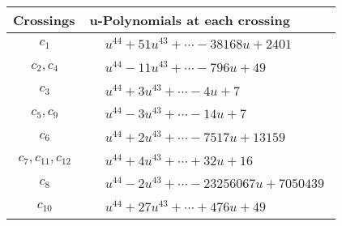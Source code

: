 \documentclass[1p]{elsarticle_modified}
\theoremstyle{definition}
\begin{document}
\begin{tabular}{m{50pt}|m{274pt}}
Crossings & \hspace{64pt}u-Polynomials at each crossing \\
\hline $$\begin{aligned}c_{1}\end{aligned}$$&$\begin{aligned}
&u^{44}+51 u^{43}+\cdots-38168 u+2401
\end{aligned}$\\
\hline $$\begin{aligned}c_{2},c_{4}\end{aligned}$$&$\begin{aligned}
&u^{44}-11 u^{43}+\cdots-796 u+49
\end{aligned}$\\
\hline $$\begin{aligned}c_{3}\end{aligned}$$&$\begin{aligned}
&u^{44}+3 u^{43}+\cdots-4 u+7
\end{aligned}$\\
\hline $$\begin{aligned}c_{5},c_{9}\end{aligned}$$&$\begin{aligned}
&u^{44}-3 u^{43}+\cdots-14 u+7
\end{aligned}$\\
\hline $$\begin{aligned}c_{6}\end{aligned}$$&$\begin{aligned}
&u^{44}+2 u^{43}+\cdots-7517 u+13159
\end{aligned}$\\
\hline $$\begin{aligned}c_{7},c_{11},c_{12}\end{aligned}$$&$\begin{aligned}
&u^{44}+4 u^{43}+\cdots+32 u+16
\end{aligned}$\\
\hline $$\begin{aligned}c_{8}\end{aligned}$$&$\begin{aligned}
&u^{44}-2 u^{43}+\cdots-23256067 u+7050439
\end{aligned}$\\
\hline $$\begin{aligned}c_{10}\end{aligned}$$&$\begin{aligned}
&u^{44}+27 u^{43}+\cdots+476 u+49
\end{aligned}$\\
\hline
\end{tabular}\\~\\
\end{document}

